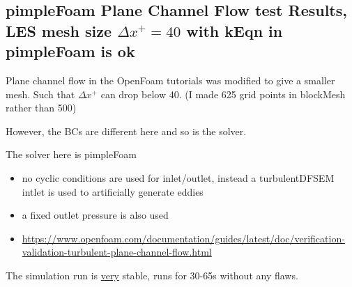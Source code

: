 \documentclass[12pt]{article}
\renewcommand{\_}{\kern-1.5pt\textunderscore\kern-1.5pt}
\begin{document}
\vspace{\baselineskip}
\subsection{pimpleFoam Plane Channel Flow test Results, LES mesh size $\Delta x^{+}=40$ with kEqn in pimpleFoam is ok}\par
Plane channel flow in the OpenFoam tutorials was modified to give a smaller mesh. Such that  \(  \Delta x^{+} \)  can drop below 40. (I made 625 grid points in blockMesh rather than 500)\par

However, the BCs are different here and so is the solver.\par

The solver here is pimpleFoam\par



\begin{itemize}
	\item no cyclic conditions are used for inlet/outlet, instead a turbulentDFSEM intlet is used to artificially generate eddies\par

	\item a fixed outlet pressure is also used\par
	
	\item \href{https://www.openfoam.com/documentation/guides/latest/doc/verification-validation-turbulent-plane-channel-flow.html}{https://www.openfoam.com/documentation/guides/latest/doc/verification-validation-turbulent-plane-channel-flow.html}\par


\end{itemize}
The simulation run is \uline{very} stable, runs for 30-65s without any flaws. \par
\end{document}
